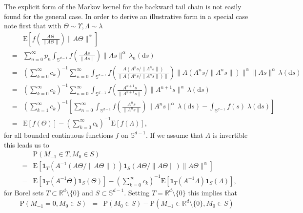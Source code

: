 \documentclass{aptpubarxiv}
\numberwithin{equation}{section}
\begin{document}
\begin{ex}
\iffalse
The explicit form of the Markov kernel for the backward tail chain is not easily found for the general case.  In order to derive an illustrative form in a special case note first that with $\Theta \sim \Upsilon, \Lambda \sim \lambda$
  \begin{eqnarray}
 \nonumber && {\mathrm{E}}\left[f\left(\frac{A \Theta}{\|A \Theta\|}\right)\|A \Theta\|^\alpha\right] \\
 \nonumber&=& \sum_{n=0}^\infty p_n \int_{\mathbb{S}^{d-1}} f\left(\frac{A s}{\|A s\|}\right)\|A s\|^\alpha\, \lambda_n (\mathrm{d} s) \\
 \nonumber&=& (\sum_{k=0}^\infty c_k)^{-1} \sum_{n=0}^\infty \int_{\mathbb{S}^{d-1}} f\left(\frac{A (A^n s/\|A^n s\|)}{\|A (A^n s/\|A^n s\|)\|}\right)\|A (A^n s/\|A^n s\|)\|^\alpha \|A s\|^\alpha\, \lambda (\mathrm{d} s) \\
 \nonumber&=& (\sum_{k=0}^\infty c_k)^{-1} \sum_{n=0}^\infty \int_{\mathbb{S}^{d-1}} f\left(\frac{A^{n+1} s}{\|A^{n+1} s \|}\right)\|A^{n+1} s\|^\alpha\, \lambda (\mathrm{d} s) \\
\nonumber&=& (\sum_{k=1}^\infty c_k)^{-1} \left[\sum_{n=0}^\infty \int_{\mathbb{S}^{d-1}} f\left(\frac{A^{n} s}{\|A^{n} s \|}\right)\|A^{n} s\|^\alpha\, \lambda (\mathrm{d} s)-\int_{\mathbb{S}^{d-1}}f(s) \;\lambda (\mathrm{d} s)\right] \\
 \label{E:losezero}&=&{\mathrm{E}}[f(\Theta)]-(\sum_{k=0}^\infty c_k)^{-1}{\mathrm{E}}[f(\Lambda)],
 \end{eqnarray}
 for all bounded continuous functions $f$ on $\mathbb{S}^{d-1}$. If we assume that $A$ is invertible this leads us to
 \begin{eqnarray*}
&&{\mathrm{P}}(M_{-1} \in T, M_0 \in S)\\
&=&{\mathrm{E}}\left[{\boldsymbol{1}}_T(A^{-1}(A\Theta /\|A \Theta \|)){\boldsymbol{1}}_S(A\Theta /\|A\Theta \|)\|A\Theta \|^\alpha \right] \\
&=& {\mathrm{E}}\left[{\boldsymbol{1}}_T(A^{-1}\Theta){\boldsymbol{1}}_S(\Theta)\right]-(\sum_{k=0}^\infty c_k)^{-1}{\mathrm{E}}\left[{\boldsymbol{1}}_T(A^{-1}\Lambda){\boldsymbol{1}}_S(\Lambda)\right],
\end{eqnarray*}
for Borel sets $T \subset \mathbb{R}^d \setminus \{0\}$  and $S \subset \mathbb{S}^{d-1}$. 
Setting $T=\mathbb{R}^d \setminus \{0\}$ this implies that
\begin{eqnarray} \nonumber {\mathrm{P}}(M_{-1}=0, M_0 \in S)&=&{\mathrm{P}}(M_0 \in S)-{\mathrm{P}}(M_{-1} \in \mathbb{R}^d \setminus \{0\}, M_0 \in S)\\

\end{eqnarray}
\end{ex}
\end{document}
